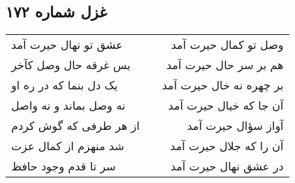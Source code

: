 \begin{center}
\section*{غزل شماره ۱۷۲}
\label{sec:sh172}
\begin{longtable}{l p{0.5cm} r}
عشق تو نهال حیرت آمد
&&
وصل تو کمال حیرت آمد
\\
بس غرقه حال وصل کآخر
&&
هم بر سر حال حیرت آمد
\\
یک دل بنما که در ره او
&&
بر چهره نه خال حیرت آمد
\\
نه وصل بماند و نه واصل
&&
آن جا که خیال حیرت آمد
\\
از هر طرفی که گوش کردم
&&
آواز سؤال حیرت آمد
\\
شد منهزم از کمال عزت
&&
آن را که جلال حیرت آمد
\\
سر تا قدم وجود حافظ
&&
در عشق نهال حیرت آمد
\\
\end{longtable}
\end{center}

